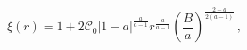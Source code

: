 \begin{equation}
\label{e23EF}
\xi \left( r\right) =
1+2\mathcal{C}_{0}\left| 1-a\right|^{\frac{a}{a-1}}
r^{\frac{a}{a-1}}\left( \frac{B}{a}\right)^{\frac{2-a}{2
\left( a-1\right) }}\,,
\end{equation}

